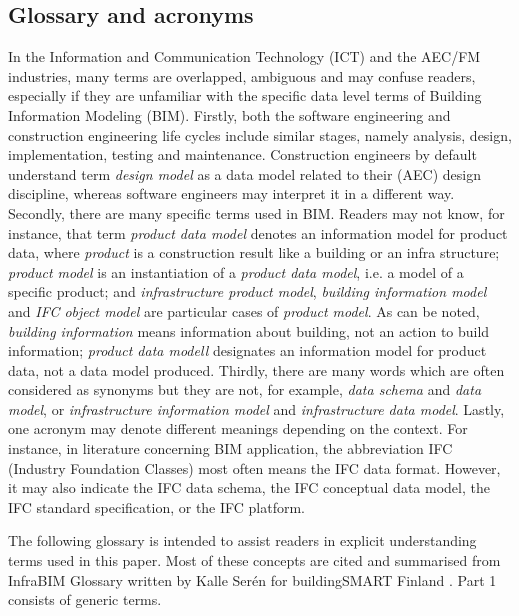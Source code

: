\subsection{Glossary and acronyms}\label{sec:glossary}

In the Information and Communication Technology (ICT) and the AEC/FM industries, many terms are overlapped, ambiguous and may confuse readers, especially if they are unfamiliar with the specific data level terms of Building Information Modeling (BIM).
Firstly, both the software engineering and construction engineering life cycles include similar stages, namely analysis, design, implementation, testing and maintenance.
Construction engineers by default understand term \emph{de\-sign mod\-el} as a data model related to their (AEC) design discipline, whereas software engineers may interpret it in a different way.
Secondly, there are many specific terms used in BIM.
Readers may not know, for instance, that term \emph{prod\-uct da\-ta mod\-el} denotes an information model for product data, where \emph{prod\-uct} is a construction result like a building or an infra structure; \emph{prod\-uct mod\-el} is an instantiation of a \emph{prod\-uct da\-ta mod\-el}, i.e. a model of a specific product; and \emph{in\-fra\-struc\-ture prod\-uct mod\-el}, \emph{build\-ing in\-for\-ma\-tion mod\-el} and \emph{IFC object mod\-el} are particular cases of \emph{prod\-uct mod\-el}.
As can be noted, \emph{building information} means information about building, not an action to build information; \emph{prod\-uct da\-ta mod\-ell} designates an information model for product data, not a data model produced.
Thirdly, there are many words which are often considered as synonyms but they are not, for example, \emph{da\-ta sche\-ma} and \emph{da\-ta mod\-el}, or \emph{in\-fra\-struc\-ture in\-for\-ma\-tion model} and \emph{in\-fra\-struc\-ture da\-ta mod\-el}.
Lastly, one acronym may denote different meanings depending on the context.
For instance, in literature concerning BIM application, the abbreviation IFC (Industry Foundation Classes) most often means the IFC data format.
However, it may also indicate the IFC data schema, the IFC conceptual data model, the IFC standard specification, or the IFC platform.




The following glossary is intended to assist readers in explicit understanding terms used in this paper.
Most of these concepts are cited and summarised from InfraBIM Glossary written by Kalle Ser\'en for buildingSMART Finland \cite{seren2014infrabim}.
Part 1 consists of generic terms.

